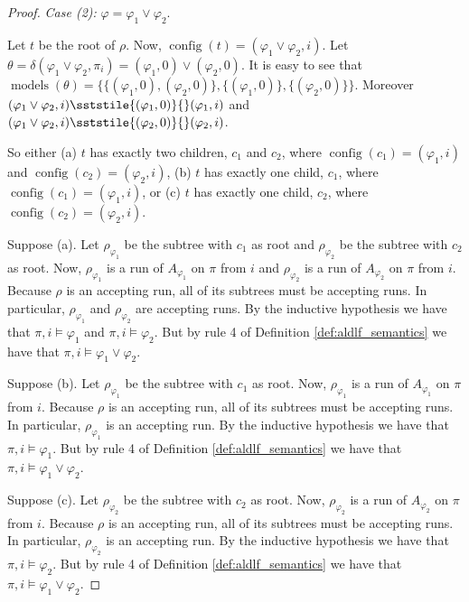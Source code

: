 \documentclass{lmcs}
\theoremstyle{definition}
\newcommand{\sderives}[1]{\sststile{#1}{}}
\DeclareMathOperator{\config}{config}
\DeclareMathOperator{\?}{?}
\DeclareMathOperator{\mymodels}{models}
\begin{document}
\begin{proof}
    \textit{Case (2):} $\varphi = \varphi_1 \vee \varphi_2$.

    Let $t$ be the root of $\rho$. Now, $\config(t) = (\varphi_1 \vee \varphi_2,i)$.
    Let $\theta = \delta(\varphi_1 \vee \varphi_2,\pi_i) = (\varphi_1,0) \vee (\varphi_2,0)$. It is easy to
    see that $\mymodels(\theta) = \{ \{ (\varphi_1,0),(\varphi_2,0)  \}, \{ (\varphi_1,0)  \}, \{ (\varphi_2,0) \} \}$.
    Moreover $(\varphi_1 \vee \varphi_2,i) \sderives{(\varphi_1,0)} (\varphi_1,i)$
    and $(\varphi_1 \vee \varphi_2,i) \sderives{(\varphi_2,0)} (\varphi_2,i)$.

    So either (a) $t$ has exactly two children, $c_1$ and $c_2$, where $\config(c_1) = (\varphi_1,i)$ and
    $\config(c_2) = (\varphi_2,i)$, (b) $t$ has exactly one child, $c_1$, where $\config(c_1) = (\varphi_1,i)$,
    or (c) $t$ has exactly one child, $c_2$, where $\config(c_2) = (\varphi_2,i)$.

    Suppose (a). Let $\rho_{\varphi_1}$ be the subtree with $c_1$ as root and $\rho_{\varphi_2}$ be the subtree
    with $c_2$ as root. Now, $\rho_{\varphi_1}$ is a run of $A_{\varphi_1}$ on $\pi$ from $i$ and $\rho_{\varphi_2}$
    is a run of $A_{\varphi_2}$ on $\pi$ from $i$. Because $\rho$ is an accepting run, all of its subtrees must
    be accepting runs. In particular, $\rho_{\varphi_1}$ and $\rho_{\varphi_2}$ are accepting runs. By the inductive hypothesis
    we have that $\pi,i \models \varphi_1$ and $\pi,i \models \varphi_2$. But by rule 4 of Definition \ref{def:aldlf_semantics}
    we have that $\pi,i \models \varphi_1 \vee \varphi_2$.

    Suppose (b). Let $\rho_{\varphi_1}$ be the subtree with $c_1$ as root. Now, $\rho_{\varphi_1}$ is a run of $A_{\varphi_1}$
    on $\pi$ from $i$. Because $\rho$ is an accepting run, all of its subtrees must be accepting runs. In particular,
    $\rho_{\varphi_1}$ is an accepting run. By the inductive hypothesis we have that $\pi,i \models \varphi_1$. But by rule 4
    of Definition \ref{def:aldlf_semantics} we have that $\pi,i \models \varphi_1 \vee \varphi_2$.

    Suppose (c). Let $\rho_{\varphi_2}$ be the subtree with $c_2$ as root. Now, $\rho_{\varphi_2}$ is a run of $A_{\varphi_2}$ on
    $\pi$ from $i$. Because $\rho$ is an accepting run, all of its subtrees must be accepting runs. In particular, $\rho_{\varphi_2}$
    is an accepting run. By the inductive hypothesis we have that $\pi,i \models \varphi_2$. But by rule 4 of
    Definition \ref{def:aldlf_semantics} we have that $\pi,i \models \varphi_1 \vee \varphi_2$.


\end{proof}
\end{document}
